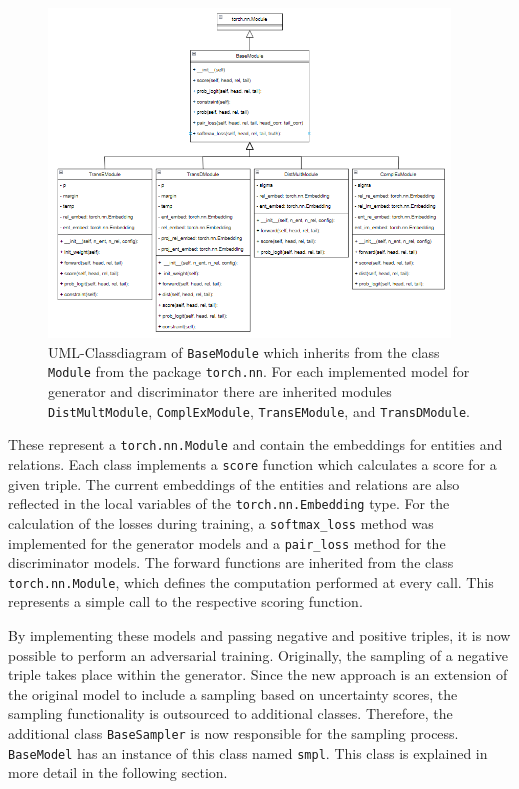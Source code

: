 \begin{figure}[t]
  \centering
    \includegraphics[width=0.95\textwidth]{figures/BaseModule.PNG}
  \caption{\ac{UML}-Classdiagram of \texttt{BaseModule} which inherits from the class \texttt{Module} from the package \texttt{torch.nn}.
  For each implemented model for generator and discriminator there are inherited modules \texttt{DistMultModule},  \texttt{ComplExModule}, \texttt{TransEModule}, and  \texttt{TransDModule}.}
  \label{fig:basemodule_classdiagram}
\end{figure}
These represent a \texttt{torch.nn.Module} and contain the embeddings for entities and relations.
Each class implements a \texttt{score} function which calculates a score for a given triple.
The current embeddings of the entities and relations are also reflected in the local variables of the \texttt{torch.nn.Embedding} type.
For the calculation of the losses during training, a \texttt{softmax\_loss} method was implemented for the generator models and a \texttt{pair\_loss} method for the discriminator models.
The forward functions are inherited from the class \texttt{torch.nn.Module}, which defines the computation performed at every call.
This represents a simple call to the respective scoring function.

By implementing these models and passing negative and positive triples, it is now possible to perform an adversarial training.
Originally, the sampling of a negative triple takes place within the generator.
Since the new approach is an extension of the original model to include a sampling based on uncertainty scores, the sampling functionality is outsourced to additional classes.
Therefore, the additional class \texttt{BaseSampler} is now responsible for the sampling process.
\texttt{BaseModel} has an instance of this class named \texttt{smpl}.
This class is explained in more detail in the following section.
\clearpage